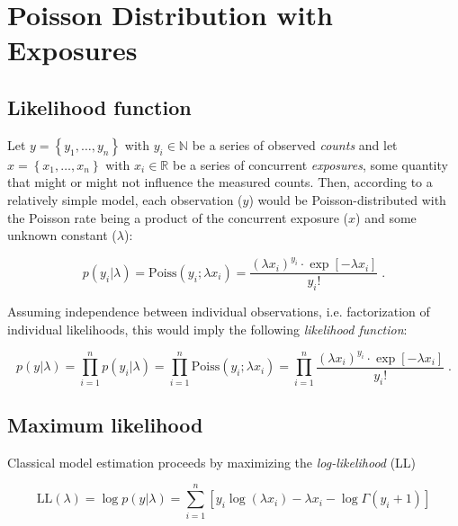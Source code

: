 

\setcounter{equation}{0}
\section{Poisson Distribution with Exposures} \label{sec:Poiss}

\subsection{Likelihood function} \label{sec:Poiss-LF}

Let $y = \left\lbrace y_1, \ldots, y_n \right\rbrace$ with $y_i \in \mathbb{N}$ be a series of observed \textit{counts} and let $x = \left\lbrace x_1, \ldots, x_n \right\rbrace$ with $x_i \in \mathbb{R}$ be a series of concurrent \textit{exposures}, some quantity that might or might not influence the measured counts. Then, according to a relatively simple model, each observation ($y$) would be Poisson-distributed with the Poisson rate being a product of the concurrent exposure ($x$) and some unknown constant ($\lambda$):

\begin{equation} \label{eq:Poiss-yi}
p(y_i|\lambda) = \mathrm{Poiss}(y_i; \lambda x_i) = \frac{(\lambda x_i)^{y_i} \cdot \exp[-\lambda x_i]}{y_i !} \; .
\end{equation}

Assuming independence between individual observations, i.e. factorization of individual likelihoods, this would imply the following \textit{likelihood function}:

\begin{equation} \label{eq:Poiss-LF}
p(y|\lambda) = \prod_{i=1}^n p(y_i|\lambda) = \prod_{i=1}^n \mathrm{Poiss}(y_i; \lambda x_i) = \prod_{i=1}^n \frac{(\lambda x_i)^{y_i} \cdot \exp[-\lambda x_i]}{y_i !} \; .
\end{equation}

\subsection{Maximum likelihood} \label{sec:Poiss-MLE}

Classical model estimation proceeds by maximizing the \textit{log-likelihood} (LL)

\begin{equation} \label{eq:Poiss-LL}
\mathrm{LL}(\lambda) = \log p(y|\lambda) = \sum_{i=1}^n \left[ y_i \log(\lambda x_i) - \lambda x_i - \log \Gamma(y_i + 1) \right]
\end{equation}

